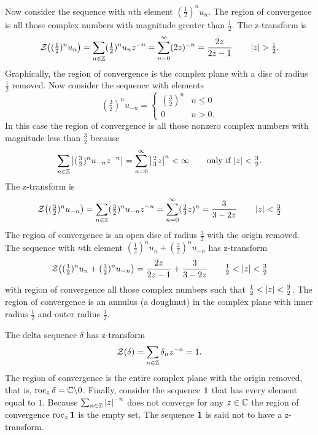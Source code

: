 Now consider the sequence with $n$th element $(\tfrac{1}{2})^{n} u_n$.  The region of convergence is all those complex numbers with magnitude greater than $\tfrac{1}{2}$.   The z-transform is
\[
{\mathcal Z}\big( (\tfrac{1}{2})^{n} u_n\big) = \sum_{n \in {\mathbb Z}} (\tfrac{1}{2})^{n} u_n z^{-n} = \sum_{n=0}^\infty (2z)^{-n} = \frac{2z}{2z - 1} \qquad \left\vert z \right\vert > \tfrac{1}{2} .
\]
Graphically, the region of convergence is the complex plane with a disc of radius $\tfrac{1}{2}$ removed.  Now consider the sequence with elements 
\[
(\tfrac{3}{2})^{n} u_{-n} =  \begin{cases} 
(\tfrac{3}{2})^{n} & n \leq 0 \\
0 & n > 0.
\end{cases}
\]
In this case the region of convergence is all those nonzero complex numbers with magnitude less than $\tfrac{3}{2}$ because
\[
\sum_{n\in{\mathbb Z}} \left\vert  (\tfrac{3}{2})^{n} u_{-n} z^{-n} \right\vert = \sum_{n=0}^\infty \left\vert \tfrac{2}{3}z \right\vert^{n} < \infty \qquad \text{only if $\left\vert z \right\vert < \tfrac{3}{2}$}.
\]
The z-transform is
\[
{\mathcal Z}\big( (\tfrac{3}{2})^n u_{-n} \big) = \sum_{n \in {\mathbb Z}} (\tfrac{3}{2})^{n} u_{-n} z^{-n} = \sum_{n=0}^\infty (\tfrac{2}{3} z)^{n} = \frac{3}{3 - 2z} \qquad \left\vert z \right\vert < \tfrac{3}{2}
\]
The region of convergence is an open disc of radius $\frac{3}{2}$ with the origin removed.  The sequence with $n$th element $(\tfrac{1}{2})^{n} u_n + (\frac{3}{2})^{n} u_{-n}$ has z-transform
\[
{\mathcal Z}\big((\tfrac{1}{2})^{n} u_n + (\tfrac{3}{2})^{n} u_{-n}\big) =  \frac{2z}{2z - 1} + \frac{3}{3 - 2z} \qquad \tfrac{1}{2} < \left\vert z \right\vert < \tfrac{3}{2}
\]
with region of convergence all those complex numbers such that $\tfrac{1}{2} < \left\vert z \right\vert < \tfrac{3}{2}$.  The region of convergence is an annulus (a doughnut) in the complex plane with inner radius $\tfrac{1}{2}$ and outer radius $\tfrac{3}{2}$.

The delta sequence $\delta$ has z-transform
\[
{\mathcal Z}(\delta) = \sum_{n \in {\mathbb Z}} \delta_n z^{-n} = 1.
\]
The region of convergence is the entire complex plane with the origin removed, that is, $\operatorname{roc}_z \delta = {\mathbb C} \backslash 0$.  Finally, consider the sequence $\mathbf{1}$ that has every element equal to $1$.  Because $\sum_{n \in {\mathbb Z}} \left\vert z \right\vert^{-n}$ does not converge for any $z \in {\mathbb C}$ the region of convergence $\operatorname{roc}_z \mathbf{1}$ is the empty set.  The sequence $\mathbf{1}$ is said not to have a z-transform.

